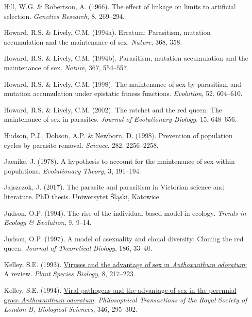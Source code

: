 \documentclass[
  letterpaper,
]{book}
\newlength{\cslhangindent}
\newenvironment{CSLReferences}[2] %
 {\begin{list}{}{%
  \setlength{\itemindent}{0pt}
  \setlength{\leftmargin}{0pt}
  \setlength{\parsep}{0pt}
  \ifodd #1
   \setlength{\leftmargin}{\cslhangindent}
   \setlength{\itemindent}{-1\cslhangindent}
  \fi
  \setlength{\itemsep}{#2\baselineskip}}}
 {\end{list}}
\begin{document}
\begin{CSLReferences}{1}{0}
Hill, W.G. \& Robertson, A. (1966). The effect of linkage on limits to
artificial selection. \emph{Genetics Research}, 8, 269--294.

Howard, R.S. \& Lively, C.M. (1994a). Erratum: Parasitism, mutation
accumulation and the maintenance of sex. \emph{Nature}, 368, 358.

Howard, R.S. \& Lively, C.M. (1994b). Parasitism, mutation accumulation
and the maintenance of sex. \emph{Nature}, 367, 554--557.

Howard, R.S. \& Lively, C.M. (1998). The maintenance of sex by
parasitism and mutation accumulation under epistatic fitness functions.
\emph{Evolution}, 52, 604--610.

Howard, R.S. \& Lively, C.M. (2002). The ratchet and the red queen: The
maintenance of sex in parasites. \emph{Journal of Evolutionary Biology},
15, 648--656.

Hudson, P.J., Dobson, A.P. \& Newborn, D. (1998). Prevention of
population cycles by parasite removal. \emph{Science}, 282, 2256--2258.

Jaenike, J. (1978). A hypothesis to account for the maintenance of sex
within populations. \emph{Evolutionary Theory}, 3, 191--194.

Jajszczok, J. (2017). The parasite and parasitism in {Victorian} science
and literature. PhD thesis. Uniwersytet Śląski, Katowice.

Judson, O.P. (1994). The rise of the individual-based model in ecology.
\emph{Trends in Ecology \& Evolution}, 9, 9--14.

Judson, O.P. (1997). A model of asexuality and clonal diversity: Cloning
the red queen. \emph{Journal of Theoretical Biology}, 186, 33--40.

Kelley, S.E. (1993).
\href{https://doi.org/10.1111/j.1442-1984.1993.tb00072.x}{Viruses and
the advantage of sex in \emph{{A}nthoxanthum odoratum}: A review}.
\emph{Plant Species Biology}, 8, 217--223.

Kelley, S.E. (1994). \href{https://doi.org/10.1098/rstb.1994.0146}{Viral
pathogens and the advantage of sex in the perennial grass
\emph{{A}nthoxanthum odoratum}}. \emph{Philosophical Transactions of the
Royal Society of London B, Biological Sciences}, 346, 295--302.


\end{CSLReferences}
\end{document}
